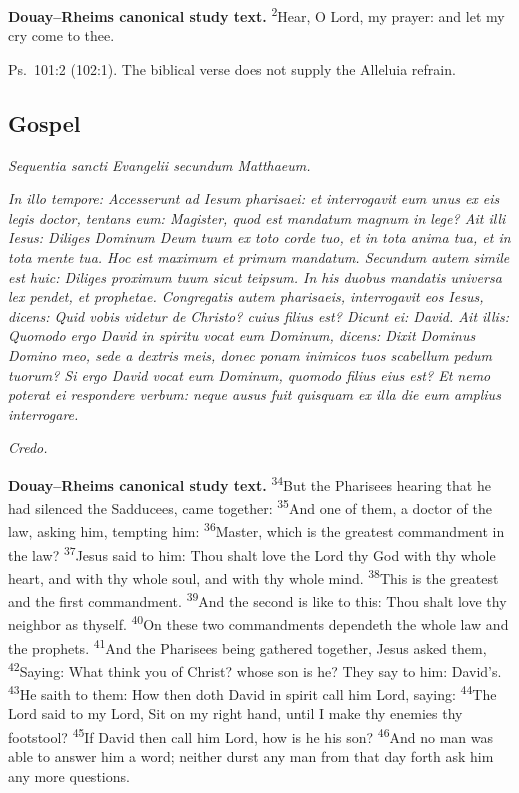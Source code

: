 \textbf{Douay--Rheims canonical study text.} \textsuperscript{2}Hear, O Lord, my prayer: and let my cry come to thee.

Ps.~101:2 (102:1). The biblical verse does not supply the Alleluia refrain.

\subsection{Gospel}\label{proper-gospel}

\textit{Sequentia sancti Evangelii secundum Matthaeum.}

\textit{In illo tempore: Accesserunt ad Iesum pharisaei: et interrogavit eum unus ex eis legis doctor, tentans eum: Magister, quod est mandatum magnum in lege? Ait illi Iesus: Diliges Dominum Deum tuum ex toto corde tuo, et in tota anima tua, et in tota mente tua. Hoc est maximum et primum mandatum. Secundum autem simile est huic: Diliges proximum tuum sicut teipsum. In his duobus mandatis universa lex pendet, et prophetae. Congregatis autem pharisaeis, interrogavit eos Iesus, dicens: Quid vobis videtur de Christo? cuius filius est? Dicunt ei: David. Ait illis: Quomodo ergo David in spiritu vocat eum Dominum, dicens: Dixit Dominus Domino meo, sede a dextris meis, donec ponam inimicos tuos scabellum pedum tuorum? Si ergo David vocat eum Dominum, quomodo filius eius est? Et nemo poterat ei respondere verbum: neque ausus fuit quisquam ex illa die eum amplius interrogare.}

\textit{Credo.}

\textbf{Douay--Rheims canonical study text.} \textsuperscript{34}But the Pharisees hearing that he had silenced the Sadducees, came together: \textsuperscript{35}And one of them, a doctor of the law, asking him, tempting him: \textsuperscript{36}Master, which is the greatest commandment in the law? \textsuperscript{37}Jesus said to him: Thou shalt love the Lord thy God with thy whole heart, and with thy whole soul, and with thy whole mind. \textsuperscript{38}This is the greatest and the first commandment. \textsuperscript{39}And the second is like to this: Thou shalt love thy neighbor as thyself. \textsuperscript{40}On these two commandments dependeth the whole law and the prophets. \textsuperscript{41}And the Pharisees being gathered together, Jesus asked them, \textsuperscript{42}Saying: What think you of Christ? whose son is he? They say to him: David’s. \textsuperscript{43}He saith to them: How then doth David in spirit call him Lord, saying: \textsuperscript{44}The Lord said to my Lord, Sit on my right hand, until I make thy enemies thy footstool? \textsuperscript{45}If David then call him Lord, how is he his son? \textsuperscript{46}And no man was able to answer him a word; neither durst any man from that day forth ask him any more questions.

